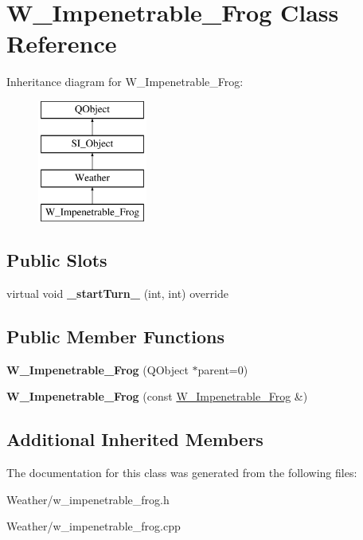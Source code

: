 \hypertarget{class_w___impenetrable___frog}{}\section{W\+\_\+\+Impenetrable\+\_\+\+Frog Class Reference}
\label{class_w___impenetrable___frog}
Inheritance diagram for W\+\_\+\+Impenetrable\+\_\+\+Frog\+:\begin{figure}[H]
\begin{center}
\leavevmode
\includegraphics[height=4.000000cm]{class_w___impenetrable___frog}
\end{center}
\end{figure}
\subsection*{Public Slots}
\begin{DoxyCompactItemize}
\item 
\mbox{\label{class_w___impenetrable___frog_a14eb042d30ad0f17d7dada28366d1379}} 
virtual void {\bfseries \+\_\+start\+Turn\+\_\+} (int, int) override
\end{DoxyCompactItemize}
\subsection*{Public Member Functions}
\begin{DoxyCompactItemize}
\item 
\mbox{\label{class_w___impenetrable___frog_a7d64fa9952e9bdacf0aff7d06f87c4aa}} 
{\bfseries W\+\_\+\+Impenetrable\+\_\+\+Frog} (Q\+Object $\ast$parent=0)
\item 
\mbox{\label{class_w___impenetrable___frog_a6388bbf5cd8362eb0c6e344b38fd57e1}} 
{\bfseries W\+\_\+\+Impenetrable\+\_\+\+Frog} (const \hyperlink{class_w___impenetrable___frog}{W\+\_\+\+Impenetrable\+\_\+\+Frog} \&)
\end{DoxyCompactItemize}
\subsection*{Additional Inherited Members}


The documentation for this class was generated from the following files\+:\begin{DoxyCompactItemize}
\item 
Weather/w\+\_\+impenetrable\+\_\+frog.\+h\item 
Weather/w\+\_\+impenetrable\+\_\+frog.\+cpp\end{DoxyCompactItemize}
